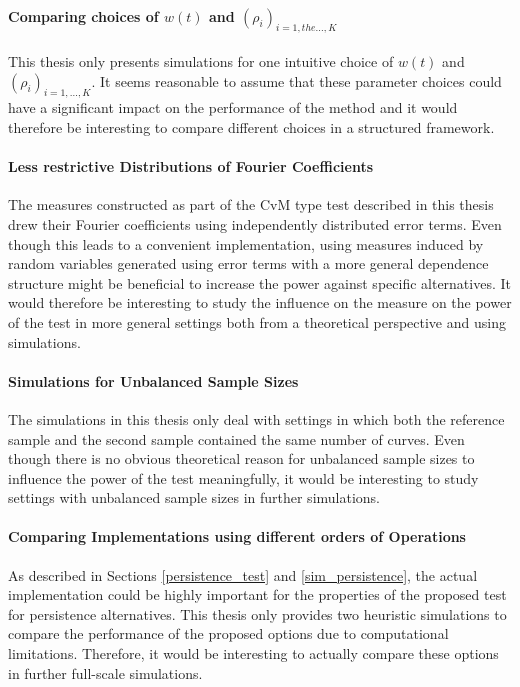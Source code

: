 \documentclass[12pt, a4paper]{article}
\theoremstyle{MAstyle} \newtheorem{assumption}{Assumption}[section]
\theoremstyle{MAstyle} \newtheorem{definition}{Definition}[section]
\theoremstyle{MAstyle} \newtheorem{theorem}{Theorem}[section]
\begin{document}
			\paragraph{Comparing choices of $w(t)$ and  $\left(\rho_i\right)_{i = 1, the \dots, K}$\\}
			This thesis only presents simulations for one intuitive choice of $w(t)$ and $\left(\rho_i\right)_{i = 1, \dots, K}$. It seems reasonable to assume that these parameter choices could have a significant impact on the performance of the method and it would therefore be interesting to compare different choices in a structured framework.
			
			\paragraph{Less restrictive Distributions of Fourier Coefficients\\}
			The measures constructed as part of the CvM type test described in this thesis drew their Fourier coefficients using independently distributed error terms. Even though this leads to a convenient implementation, using measures induced by random variables generated using error terms with a more general dependence structure might be beneficial to increase the power against specific alternatives. It would therefore be interesting to study the influence on the measure on the power of the test in more general settings both from a theoretical perspective and using simulations. 
		
			\paragraph{Simulations for Unbalanced Sample Sizes\\}
			The simulations in this thesis only deal with settings in which both the reference sample and the second sample contained the same number of curves. Even though there is no obvious theoretical reason for unbalanced sample sizes to influence the power of the test meaningfully, it would be interesting to study settings with unbalanced sample sizes in further simulations.		
			
			\paragraph{Comparing Implementations using different orders of Operations\\}
			As described in Sections \ref{persistence_test} and \ref{sim_persistence}, the actual implementation could be highly important for the properties of the proposed test for persistence alternatives. This thesis only provides two heuristic simulations to compare the performance of the proposed options due to computational limitations. Therefore, it would be interesting to actually compare these options in further full-scale simulations.
		
\end{document}

